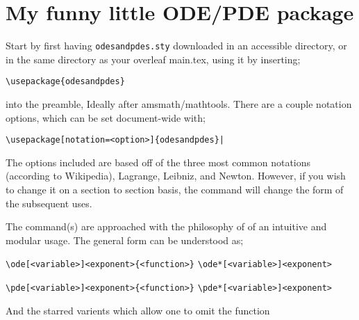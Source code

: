 \documentclass[a4paper,11pt]{ltxdoc}
\begin{document}
\section*{My funny little ODE/PDE package}
\vspace{1em}
Start by first having \verb|odesandpdes.sty| downloaded in an accessible directory, or in the same directory as your overleaf main.tex, using it by inserting; 
\begin{verbatim}
\usepackage{odesandpdes}
\end{verbatim}
into the preamble, Ideally after amsmath/mathtools. There are a couple notation options, which can be set document-wide with; 
\begin{verbatim}
\usepackage[notation=<option>]{odesandpdes}|
\end{verbatim}


The options included are based off of the three most common notations (according to Wikipedia), Lagrange, Leibniz, and Newton. 
However, if you wish to change it on a section to section basis, the command  will change the form of the subsequent uses.


\begin{macro}{\ode}
\begin{macro}{\ode*}
The command(s) are approached with the philosophy of of an intuitive and modular usage. The general form can be understood as;\par

\noindent
\verb|\ode[<variable>]<exponent>{<function>}| \newline
\verb|\ode*[<variable>]<exponent>| 
\end{macro}
\end{macro}




\begin{macro}{\pde}
\begin{macro}{\pde*}
\verb|\pde[<variable>]<exponent>{<function>}| \newline
\verb|\pde*[<variable>]<exponent>| 
\end{macro}
\end{macro}

{And the starred varients which allow one to omit the function}\newline
\end{document}
